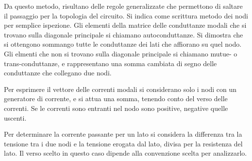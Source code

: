 \documentclass{article}
\numberwithin{equation}{subsection}
\begin{document}
Da questo metodo, risultano delle regole generalizzate che permettono di saltare il passaggio per la topologia del circuito. Si indica come scrittura metodo dei nodi per 
semplice ispezione. Gli elementi della matrice delle conduttanze modali che si trovano sulla diagonale principale si chiamano autoconduttanze. Si dimostra che si ottengono 
sommango tutte le conduttanze dei lati che affiorano su quel nodo. Gli elmenti che non si trovano sulla diagonale principale si chiamano mutue- o trans-conduttanze, e 
rappresentano una somma cambiata di segno delle conduttanze che collegano due nodi. 


Per esprimere il vettore delle correnti modali si considerano solo i nodi con un generatore 
di corrente, e si attua una somma, tenendo conto del verso delle correnti. Se le correnti sono entranti nel nodo sono positive, negative quelle uscenti. 


Per determinare la corrente passante per un lato si considera la differenza tra la tensione tra i due nodi e la tensione erogata dal lato, divisa per la resistenza del lato. 
Il verso scelto in questo caso dipende alla convenzione scelta per analizzarlo. 
\end{document}
